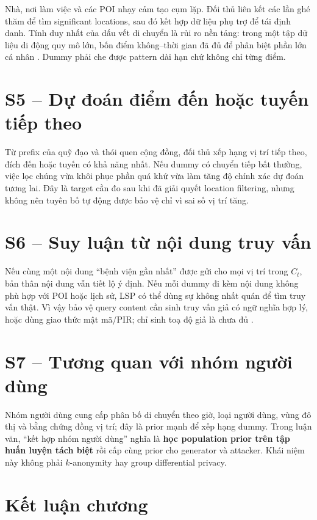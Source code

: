 \documentclass[12pt,a4paper,oneside]{report}
\begin{document}
Nhà, nơi làm việc và các POI nhạy cảm tạo cụm lặp. Đối thủ liên kết các lần ghé thăm để tìm significant locations, sau đó kết hợp dữ liệu phụ trợ để tái định danh. Tính duy nhất của dấu vết di chuyển là rủi ro nền tảng: trong một tập dữ liệu di động quy mô lớn, bốn điểm không--thời gian đã đủ để phân biệt phần lớn cá nhân \citep{demontjoye2013unique}. Dummy phải che được pattern dài hạn chứ không chỉ từng điểm.

\section{S5 -- Dự đoán điểm đến hoặc tuyến tiếp theo}

Từ prefix của quỹ đạo và thói quen cộng đồng, đối thủ xếp hạng vị trí tiếp theo, đích đến hoặc tuyến có khả năng nhất. Nếu dummy có chuyển tiếp bất thường, việc lọc chúng vừa khôi phục phần quá khứ vừa làm tăng độ chính xác dự đoán tương lai. Đây là target cần đo sau khi đã giải quyết location filtering, nhưng không nên tuyên bố tự động được bảo vệ chỉ vì sai số vị trí tăng.

\section{S6 -- Suy luận từ nội dung truy vấn}

Nếu cùng một nội dung ``bệnh viện gần nhất'' được gửi cho mọi vị trí trong $C_t$, bản thân nội dung vẫn tiết lộ ý định. Nếu mỗi dummy đi kèm nội dung không phù hợp với POI hoặc lịch sử, LSP có thể dùng sự không nhất quán để tìm truy vấn thật. Vì vậy bảo vệ query content cần sinh truy vấn giả có ngữ nghĩa hợp lý, hoặc dùng giao thức mật mã/PIR; chỉ sinh toạ độ giả là chưa đủ \citep{wu2021fakequery}.

\section{S7 -- Tương quan với nhóm người dùng}

Nhóm người dùng cung cấp phân bố di chuyển theo giờ, loại người dùng, vùng đô thị và bằng chứng đồng vị trí; đây là prior mạnh để xếp hạng dummy. Trong luận văn, ``kết hợp nhóm người dùng'' nghĩa là \textbf{học population prior trên tập huấn luyện tách biệt} rồi cấp cùng prior cho generator và attacker. Khái niệm này không phải $k$-anonymity hay group differential privacy.

\section{Kết luận chương}
\end{document}
